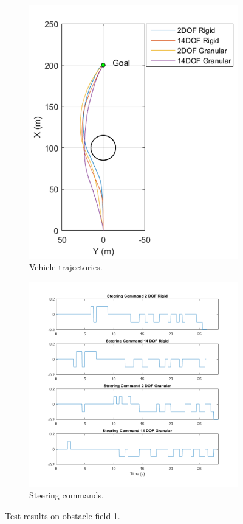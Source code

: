 \documentclass[12pt,onecolumn]{article}
\begin{document}
\begin{figure}
	\centering
	\begin{subfigure}[b]{\columnwidth}
		\centering
		\includegraphics[height=\columnwidth]{Figs/ObstacleField1Trajectories.png}
		\caption{{\small Vehicle trajectories.}}   
		\label{fig:ObstacleField1Trajectories}
	\end{subfigure}
	\hfill
	\begin{subfigure}[b]{\columnwidth}
		\centering
		\includegraphics[width=\columnwidth]{Figs/SteeringCommandsField1.png}
		\caption{\small Steering commands.}   
		\label{fig:SteeringCommandsField1}
	\end{subfigure}
	\caption{\small Test results on obstacle field 1.}
	\label{fig:Obst1TestData}
\end{figure}
\end{document}
